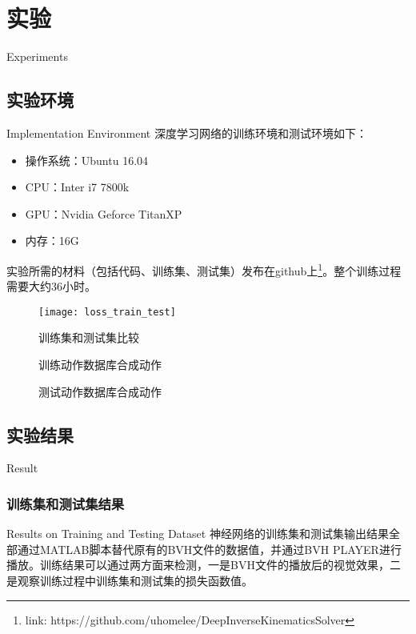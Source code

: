 \chapter{实验}{Experiments}
\section{实验环境}{Implementation Environment}
\label{sec:implementation}
深度学习网络的训练环境和测试环境如下：
\begin{itemize}
	\item{操作系统：}Ubuntu 16.04
	\item{CPU：}Inter i7 7800k
	\item{GPU：}Nvidia Geforce TitanXP
	\item{内存：}16G
\end{itemize}
实验所需的材料（包括代码、训练集、测试集）发布在github上\footnote{link: https://github.com/uhomelee/DeepInverseKinematicsSolver}。整个训练过程需要大约36小时。
\begin{figure}[!htbp]
	\centering
	\texttt{[image: loss\_train\_test]}
	\caption[]{\label{fig:train_test}
		训练集和测试集比较
	}
\end{figure}
\begin{figure}
\centering
{}
\caption{训练动作数据库合成动作}
\label{fig:train_screenshot}
\end{figure}
\begin{figure}
\centering
{}
\caption{测试动作数据库合成动作}
\label{fig:test_screenshot}
\end{figure}
\section{实验结果}{Result}
\subsection{训练集和测试集结果}{Results on Training and Testing Dataset}
神经网络的训练集和测试集输出结果全部通过MATLAB脚本替代原有的BVH文件的数据值，并通过BVH PLAYER进行播放。训练结果可以通过两方面来检测，一是BVH文件的播放后的视觉效果，二是观察训练过程中训练集和测试集的损失函数值。

